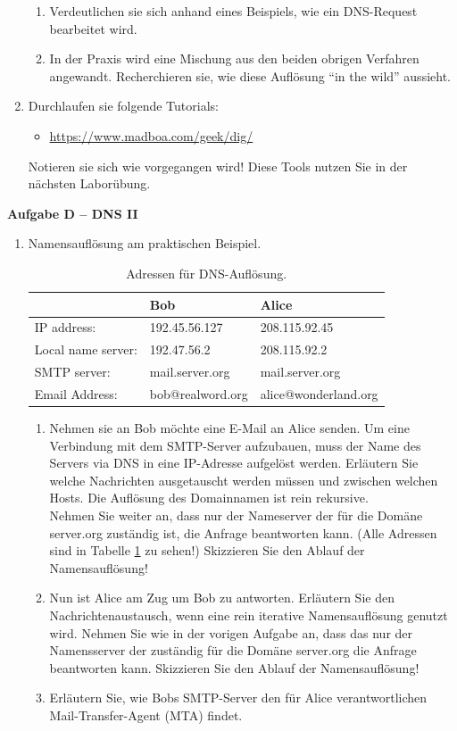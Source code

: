 \documentclass[paper=a4,fontsize=11pt]{scrartcl}%
\numberwithin{equation}{section}
\begin{document}
\begin{enumerate}
\begin{enumerate}
		\item Verdeutlichen sie sich anhand eines Beispiels, wie ein DNS-Request bearbeitet wird.
		\item In der Praxis wird eine Mischung aus den beiden obrigen Verfahren angewandt. Recherchieren sie, wie diese Auflösung \enquote{in the wild} aussieht.
	\end{enumerate}
	\item Durchlaufen sie folgende Tutorials:
	\begin{itemize}
	\item \url{https://www.madboa.com/geek/dig/}
	\end{itemize}
	Notieren sie sich wie vorgegangen wird! Diese Tools nutzen Sie in der nächsten Laborübung.
\end{enumerate}
\begin{center}
\Large{\textbf{Aufgabe D -- DNS II}}
\end{center}

\begin{enumerate}
	\item Namensauflösung am praktischen Beispiel.
\begin{table}[h]
\caption{Adressen für DNS-Auflösung.}
\label{dns_mail}
\centering
\begin{tabular}{lll}
\hline
 & Bob & Alice \\ \hline
 IP address: &  192.45.56.127 & 208.115.92.45\\
 Local name server:& 192.47.56.2 & 208.115.92.2\\
 SMTP server: & mail.server.org & mail.server.org\\
 Email Address: & bob@realword.org & alice@wonderland.org\\ \hline
\end{tabular}
\end{table}
	\begin{enumerate}
		\item Nehmen sie an Bob möchte eine E-Mail an Alice senden. Um eine Verbindung mit dem SMTP-Server aufzubauen, muss der Name des Servers via DNS in eine IP-Adresse aufgelöst werden. Erläutern Sie welche Nachrichten ausgetauscht werden müssen und zwischen welchen Hosts. Die Auflösung des Domainnamen ist rein rekursive.\\
		Nehmen Sie weiter an, dass nur der Nameserver der für die Domäne server.org zuständig ist, die Anfrage beantworten kann. (Alle Adressen sind in Tabelle \ref{dns_mail} zu sehen!) Skizzieren Sie den Ablauf der Namensauflösung!
		\item Nun ist Alice am Zug um Bob zu antworten. Erläutern Sie den Nachrichtenaustausch, wenn eine rein iterative Namensauflösung genutzt wird. Nehmen Sie wie in der vorigen Aufgabe an, dass das nur der Namensserver der zuständig für die Domäne server.org die Anfrage beantworten kann. Skizzieren Sie den Ablauf der Namensauflösung!
		\item Erläutern Sie, wie Bobs SMTP-Server den für Alice verantwortlichen Mail-Transfer-Agent (MTA) findet.
	\end{enumerate}	
\end{enumerate}
\end{document}
